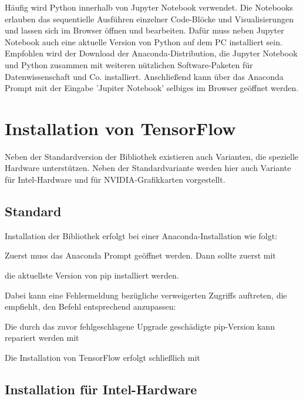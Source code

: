 Häufig wird Python innerhalb von Jupyter Notebook verwendet. Die Notebooks erlauben das sequentielle Ausführen einzelner Code-Blöcke und Visualisierungen und lassen sich im Browser öffnen und bearbeiten. Dafür muss neben Jupyter Notebook auch eine aktuelle Version von Python auf dem PC installiert sein. Empfohlen wird der Download der Anaconda-Distribution, die Jupyter Notebook und Python zusammen mit weiteren nützlichen Software-Paketen für Datenwissenschaft und Co. installiert. Anschließend kann über das Anaconda Prompt mit der Eingabe 'Jupiter Notebook' selbiges im Browser geöffnet werden.


\section{Installation von TensorFlow}

Neben der Standardversion der Bibliothek existieren auch Varianten, die
spezielle Hardware unterstützen. Neben der Standardvariante werden hier auch
Variante für Intel-Hardware und für NVIDIA-Grafikkarten vorgestellt.


\subsection{Standard}


Installation der Bibliothek erfolgt bei einer Anaconda-Installation wie folgt:

Zuerst muss das Anaconda Prompt geöffnet werden. Dann sollte zuerst mit

\medskip 
{}
\medskip

die aktuellste Version von pip installiert werden. 

Dabei kann eine Fehlermeldung bezügliche verweigerten Zugriffs auftreten, die empfiehlt, den Befehl entsprechend anzupassen:

\medskip
{}
\medskip

Die durch das zuvor fehlgeschlagene Upgrade geschädigte pip-Version kann repariert werden mit

\medskip
{}
\medskip

Die Installation von TensorFlow erfolgt schließlich mit

\medskip



\subsection{Installation für Intel-Hardware} %


